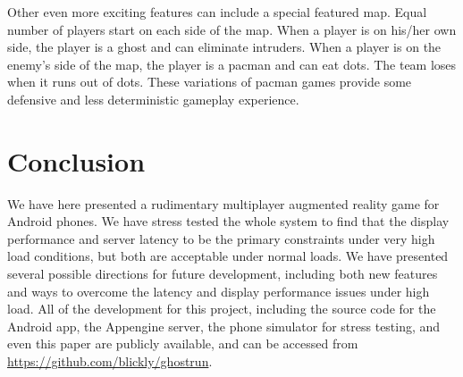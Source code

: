 \documentclass{acm_proc_article-sp}
\begin{document}
Other even more exciting features can include a special featured
map. Equal number of players start on each side of the map. When a
player is on his/her own side, the player is a ghost and can eliminate
intruders. When a player is on the enemy's side of the map, the player
is a pacman and can eat dots. The team loses when it runs out of
dots. These variations of pacman games provide some defensive and less
deterministic gameplay experience.


\section{Conclusion}

We have here presented a rudimentary multiplayer augmented reality game for
Android phones. We have stress tested the whole system to find that the display
performance and server latency to be the primary constraints under very high
load conditions, but both are acceptable under normal loads.  We have presented
several possible directions for future development, including both new features
and ways to overcome the latency and display performance issues under high
load.  All of the development for this project, including the source code for
the Android app, the Appengine server, the phone simulator for stress testing,
and even this paper are publicly available, and can be accessed from
\url{https://github.com/blickly/ghostrun}.



\end{document}
